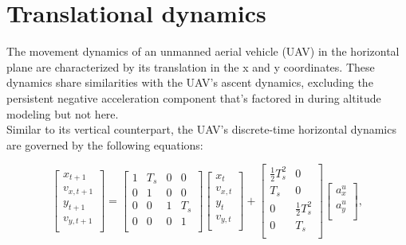 \documentclass{article}
\begin{document}
\noindent
\section{Translational dynamics}

The movement dynamics of an unmanned aerial vehicle (UAV) in the horizontal
plane are characterized by its translation in the x and y coordinates. 
These dynamics share similarities with the UAV's ascent dynamics, 
excluding the persistent negative acceleration component that's factored 
in during altitude modeling but not here.
\\

\noindent
Similar to its vertical counterpart, the UAV's discrete-time horizontal 
dynamics are governed by the following equations:

\begin{equation}
\begin{bmatrix}
    x_{t+1} \\
    v_{x,t+1} \\
    y_{t+1} \\
    v_{y,t+1} \\
\end{bmatrix} =
\begin{bmatrix}
    1 & T_s & 0 & 0 \\
    0 & 1 & 0 & 0 \\
    0 & 0 & 1 & T_s \\
    0 & 0 & 0 & 1 \\
\end{bmatrix}
\begin{bmatrix}
    x_t \\
    v_{x,t} \\
    y_t \\
    v_{y,t} \\
\end{bmatrix} +
\begin{bmatrix}
    \frac{1}{2}T_s^2 & 0 \\
    T_s & 0 \\
    0 & \frac{1}{2}T_s^2 \\
    0 & T_s \\
\end{bmatrix}
\begin{bmatrix}
    a_{x}^u \\
    a_{y}^u \\
\end{bmatrix},
\end{equation}
\end{document}
